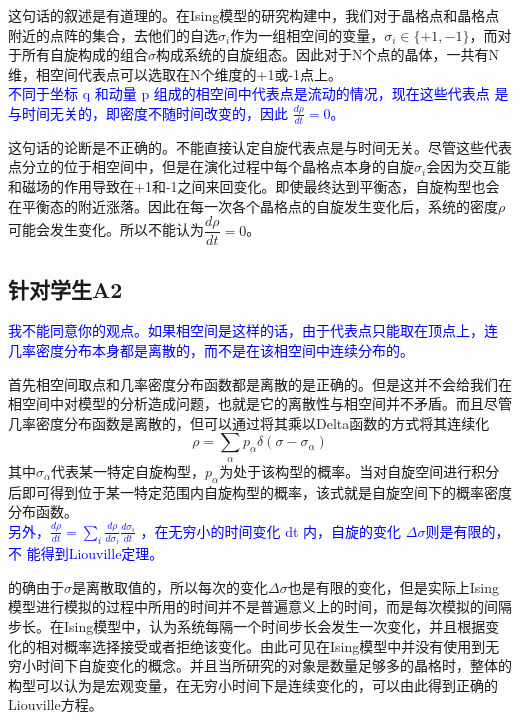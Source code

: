 \documentclass{article}
\begin{document}
这句话的叙述是有道理的。在Ising模型的研究构建中，我们对于晶格点和晶格点附近的点阵的集合，去他们的自选$ \sigma_i $作为一组相空间的变量，$ \sigma_i\in\{+1,-1\} $，而对于所有自旋构成的组合$ \sigma $构成系统的自旋组态。因此对于N个点的晶体，一共有N维，相空间代表点可以选取在N个维度的+1或-1点上。\\


\textcolor{blue}{不同于坐标 q 和动量 p 组成的相空间中代表点是流动的情况，现在这些代表点
	是与时间无关的，即密度不随时间改变的，因此 $ \frac{d\rho}{dt}=0 $。}


这句话的论断是不正确的。不能直接认定自旋代表点是与时间无关。尽管这些代表点分立的位于相空间中，但是在演化过程中每个晶格点本身的自旋$ \sigma_i $会因为交互能和磁场的作用导致在+1和-1之间来回变化。即使最终达到平衡态，自旋构型也会在平衡态的附近涨落。因此在每一次各个晶格点的自旋发生变化后，系统的密度$\rho$可能会发生变化。所以不能认为$ \dfrac{d\rho}{dt}=0 $。

\subsection{针对学生A2}
\textcolor{blue}{我不能同意你的观点。如果相空间是这样的话，由于代表点只能取在顶点上，连
	几率密度分布本身都是离散的，而不是在该相空间中连续分布的。}


首先相空间取点和几率密度分布函数都是离散的是正确的。但是这并不会给我们在相空间中对模型的分析造成问题，也就是它的离散性与相空间并不矛盾。而且尽管几率密度分布函数是离散的，但可以通过将其乘以Delta函数的方式将其连续化
\begin{equation}
	\rho=\sum_{\alpha}p_{\alpha}\delta(\sigma-\sigma_{\alpha})
\end{equation}
其中$ \sigma_{\alpha} $代表某一特定自旋构型，$ p_{\alpha} $为处于该构型的概率。当对自旋空间进行积分后即可得到位于某一特定范围内自旋构型的概率，该式就是自旋空间下的概率密度分布函数。\\


\textcolor{blue}{另外，$ \frac{d\rho}{dt}=\sum_{i}\frac{d\rho}{d\sigma_i}\frac{d\sigma_i}{dt} $
	，在无穷小的时间变化 dt 内，自旋的变化 $\Delta\sigma$则是有限的，不
	能得到Liouville定理。}


的确由于$ \sigma $是离散取值的，所以每次的变化$ \Delta\sigma $也是有限的变化，但是实际上Ising模型进行模拟的过程中所用的时间并不是普遍意义上的时间，而是每次模拟的间隔步长。在Ising模型中，认为系统每隔一个时间步长会发生一次变化，并且根据变化的相对概率选择接受或者拒绝该变化。由此可见在Ising模型中并没有使用到无穷小时间下自旋变化的概念。并且当所研究的对象是数量足够多的晶格时，整体的构型可以认为是宏观变量，在无穷小时间下是连续变化的，可以由此得到正确的Liouville方程。\\
\end{document}
